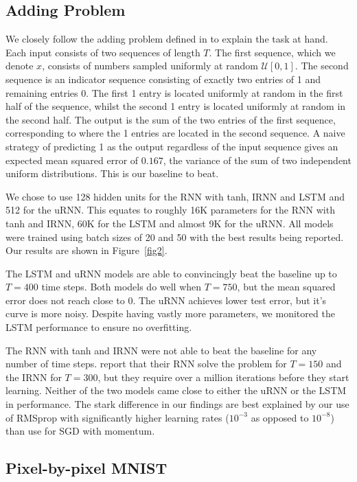 \documentclass{article} %
\begin{document}
\subsection{Adding Problem}

We closely follow the adding problem defined in \cite{LSTM} to explain the task at hand.
Each input consists of two sequences of length $T$. 
The first sequence, which we denote $x$, consists of numbers sampled uniformly at random 
$\mathcal{U}[0,1]$. 
The second sequence is an indicator sequence consisting of exactly two entries of 1 and remaining entries 0.
The first 1 entry is located uniformly at random in the first half of the sequence, whilst the second 1
entry is located uniformly at random in the second half.
The output is the sum of the two entries of the first sequence, corresponding to where the 1 entries are
located in the second sequence. A naive strategy of predicting 1 as the output regardless of the input sequence gives an expected mean
squared error of $0.167$, the variance of the sum of two independent uniform distributions.
This is our baseline to beat.

We chose to use 128 hidden units for the RNN with tanh, IRNN and LSTM and 512 for the uRNN.
This equates to roughly 16K parameters for the RNN with tanh and IRNN, 60K for the LSTM and almost 9K for
the uRNN. All models were trained using batch sizes of 20 and 50 with the best results being reported.
Our results are shown in Figure~\ref{fig2}.

The LSTM and uRNN models are able to convincingly beat the baseline up to $T=400$ time steps.
Both models do well when $T=750$, but the mean squared error does not reach close to $0$.
The uRNN achieves lower test error, but it's curve is more noisy. Despite having vastly more parameters,
we monitored the LSTM performance to ensure no overfitting.

The RNN with tanh and IRNN were not able to beat the baseline for any number of time steps. 
\cite{Quoc2015} report that their RNN solve the problem for $T=150$ and the IRNN for $T=300$,
but they require over a million iterations before they start learning. 
Neither of the two models came close to either the uRNN or the LSTM in performance.
The stark difference in our findings are best explained by our use of RMSprop with significantly higher 
learning rates ($10^{-3}$ as opposed to $10^{-8}$) than \cite{Quoc2015} use for SGD with momentum.

\vspace{-0.25mm}
\subsection{Pixel-by-pixel MNIST}
\end{document}
